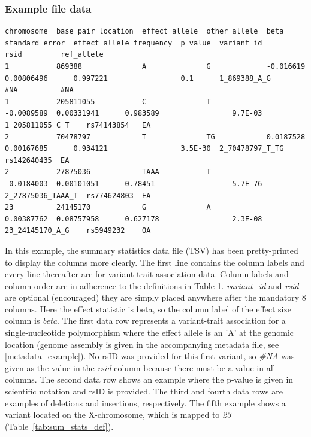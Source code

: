 \documentclass[11pt]{article}
\begin{document}
\begin{landscape}
\subsubsection{Example file data}
\scriptsize
\begin{verbatim}
chromosome  base_pair_location  effect_allele  other_allele  beta        standard_error  effect_allele_frequency  p_value  variant_id         rsid         ref_allele
1           869388              A              G             -0.016619   0.00806496      0.997221                 0.1      1_869388_A_G       #NA          #NA  
1           205811055           C              T             -0.0089589  0.00331941      0.983589                 9.7E-03  1_205811055_C_T    rs74143854   EA
2           70478797            T              TG            0.0187528   0.00167685      0.934121                 3.5E-30  2_70478797_T_TG    rs142640435  EA
2           27875036            TAAA           T             -0.0184003  0.00101051      0.78451                  5.7E-76  2_27875036_TAAA_T  rs774624803  EA
23          24145170            G              A             0.00387762  0.08757958      0.627178                 2.3E-08  23_24145170_A_G    rs5949232    OA
\end{verbatim}

\normalsize
        In this example, the summary statistics data file (TSV) has been pretty-printed to display the columns more clearly. The first line contains the column labels and every line thereafter are for variant-trait association data. Column labels and column order are in adherence to the definitions in Table 1. \textit{variant\_id} and \textit{rsid} are optional (encouraged) they are simply placed anywhere after the mandatory 8 columns. Here the effect statistic is beta, so the column label of the effect size column is \textit{beta}. The first data row represents a variant-trait association for a single-nucleotide polymorphism where the effect allele is an 'A' at the genomic location (genome assembly is given in the accompanying metadata file, see \ref{metadata_example}). No rsID was provided for this first variant, so \textit{\#NA} was given as the value in the \textit{rsid} column because there must be a value in all columns. The second data row shows an example where the p-value is given in scientific notation and rsID is provided. The third and fourth data rows are examples of deletions and insertions, respectively. The fifth example shows a variant located on the X-chromosome, which is mapped to \textit{23} (Table~\ref{tab:sum_stats_def}).
\end{landscape}
\end{document}
